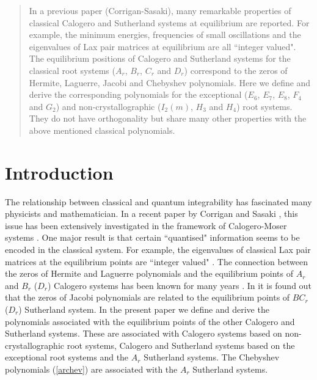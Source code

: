 \documentclass[a4paper,12pt]{article}
\begin{document}
\begin{abstract}
In a previous paper (Corrigan-Sasaki), many remarkable properties of
classical Calogero and Sutherland systems at equilibrium are reported.
For example, the minimum energies, frequencies of small oscillations and
the eigenvalues of Lax pair matrices at equilibrium are all ``integer valued".
The equilibrium positions of Calogero and Sutherland systems for the
classical root systems ($A_r$, $B_r$, $C_r$ and $D_r$) correspond to
the zeros of Hermite, Laguerre, Jacobi and Chebyshev polynomials.
Here we define and derive the corresponding polynomials for the exceptional
($E_6$, $E_7$, $E_8$, $F_4$ and $G_2$) and non-crystallographic ($I_2(m)$,
$H_3$ and $H_4$) root systems. They do not have orthogonality but share
many other properties with the above mentioned classical polynomials.
\end{abstract}

\newpage
\section{Introduction}
\label{intro}
\setcounter{equation}{0}

The relationship between classical and quantum integrability
has fascinated many physicists and mathematician.
In a recent paper by Corrigan and Sasaki \cite{cs}, this issue has been
extensively investigated in the framework of Calogero-Moser systems
\cite{Cal,Sut,CalMo}. One major result is that certain
``quantised" information seems to be encoded in the classical
system. For example, the eigenvalues of classical Lax pair matrices
at the equilibrium points are ``integer valued" \cite{cs}.
The connection between the zeros of Hermite and Laguerre
polynomials and the equilibrium points of $A_r$ and $B_r$
($D_r$) Calogero systems has been known for many years
\cite{calmat,calpere,ahmcal}.
In \cite{cs} it is found out that the zeros of Jacobi
polynomials are related to the equilibrium points of $BC_r$
($D_r$) Sutherland system.
In the present paper we define and derive the polynomials associated
with the equilibrium points of the other Calogero and Sutherland 
systems. These are associated with Calogero systems based on
non-crystallographic root systems, Calogero and Sutherland
systems based on the exceptional root systems and the $A_r$ Sutherland
systems. The Chebyshev polynomials (\ref{archev}) are associated with
the $A_r$ Sutherland systems.
\end{document}
